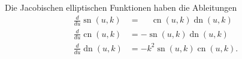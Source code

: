 \begin{satz}
%
\label{buch:elliptisch:satz:ableitungen}
Die Jacobischen elliptischen Funktionen haben die Ableitungen
\begin{equation}
\begin{aligned}
\frac{d}{du}\operatorname{sn}(u,k)
&=
\phantom{-}\operatorname{cn}(u,k)\operatorname{dn}(u,k)
\\
\frac{d}{du}\operatorname{cn}(u,k)
&=
-\operatorname{sn}(u,k)\operatorname{dn}(u,k)
\\
\frac{d}{du}\operatorname{dn}(u,k)
&=
-k^2\operatorname{sn}(u,k)\operatorname{cn}(u,k).
\end{aligned}
\label{buch:elliptisch:eqn:ableitungsregeln}
\end{equation}
\end{satz}

%
%
